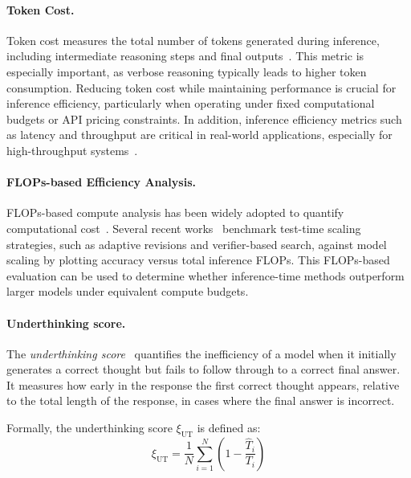 \paragraph{Token Cost.}
Token cost measures the total number of tokens generated during inference, including intermediate reasoning steps and final outputs~\citep{welleck2024decoding, brown2024large, hou2025advancing, yang2025towards,xu2025softcotsoftchainofthoughtefficient,wang2025makepennycountdifficultyadaptive,aytes2025sketchofthoughtefficientllmreasoning}. This metric is especially important, as verbose reasoning typically leads to higher token consumption. Reducing token cost while maintaining performance is crucial for inference efficiency, particularly when operating under fixed computational budgets or API pricing constraints. 
In addition, inference efficiency metrics such as latency and throughput are critical in real-world applications, especially for high-throughput systems~\citep{welleck2024decoding}.

\paragraph{FLOPs-based Efficiency Analysis.}
FLOPs-based compute analysis has been widely adopted to quantify computational cost~\citep{kaplan2020scalinglawsneurallanguage, snell2024scaling, wu2024inference, teng2025atom}. Several recent works~\citep{snell2024scaling, wu2024inference} benchmark test-time scaling strategies, such as adaptive revisions and verifier-based search, against model scaling by plotting accuracy versus total inference FLOPs. This FLOPs-based evaluation can be used to determine whether inference-time methods outperform larger models under equivalent compute budgets.

\paragraph{Underthinking score.}
The \emph{underthinking score}~\citep{wang2025thoughtsplaceunderthinkingo1like} quantifies the inefficiency of a model when it initially generates a correct thought but fails to follow through to a correct final answer. It measures how early in the response the first correct thought appears, relative to the total length of the response, in cases where the final answer is incorrect.

Formally, the underthinking score $\xi_{\mathrm{UT}}$ is defined as:
\begin{equation}
\xi_{\mathrm{UT}} = \frac{1}{N} \sum_{i=1}^{N} \left(1 - \frac{\hat{T}_i}{T_i} \right)
\end{equation}

